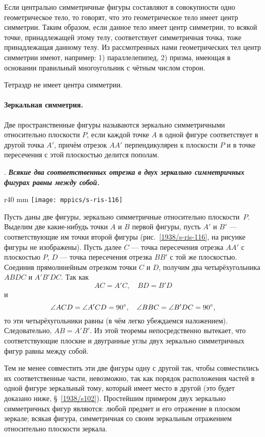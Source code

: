 Если центрально симметричные фигуры составляют в совокупности одно геометрическое тело, то говорят, что это геометрическое тело имеет центр симметрии.
Таким образом, если данное тело имеет центр симметрии, то всякой точке, принадлежащей этому телу, соответствует симметричная точка, тоже принадлежащая данному телу.
Из рассмотренных нами геометрических тел центр симметрии имеют, например: 1) параллелепипед, 2) призма, имеющая в основании правильный многоугольник с чётным числом сторон.

Тетраэдр не имеет центра симметрии.

\paragraph{Зеркальная симметрия.}\label{1938/s100}
Две пространственные фигуры называются зеркально симметричными относительно плоскости $P$, если каждой точке $A$ в одной фигуре соответствует в другой точка $A'$, причём отрезок $AA'$ перпендикулярен к плоскости $P$ и в точке пересечения с этой плоскостью делится пополам.

\medskip

.
\textbf{\emph{Всякие два соответственных отрезка в двух зеркально симметричных фигурах равны между собой.}}

\begin{wrapfigure}{r}{40 mm}
\vskip-0mm
\centering
\texttt{[image: mppics/s-ris-116]}
\caption{}\label{1938/s-ris-116}
\vskip-0mm
\end{wrapfigure}

Пусть даны две фигуры, зеркально симметричные относительно плоскости~$P$.
Выделим две какие-нибудь точки $A$ и $B$ первой фигуры, пусть $A'$ и $B'$ — соответствующие им точки второй фигуры (рис.~\ref{1938/s-ris-116}, на рисунке фигуры не изображены).
Пусть далее $C$ — точка пересечения отрезка $AA'$ с плоскостью $P$, $D$ — точка пересечения отрезка $BB'$ с той же плоскостью.
Соединив прямолинейным отрезком точки $C$ и $D$, получим два четырёхугольника $ABDC$ и $A'B'DC$.
Так как \[AC = A'C,\quad BD = B'D\] 
и 
\[\angle ACD = \angle A'CD=90\degree,\quad  \angle BBC = \angle B'DC=90\degree,\] то эти четырёхугольники равны (в чём легко убеждаемся наложением).
Следовательно, $AB=A'B'$.
Из этой теоремы непосредственно вытекает, что соответствующие плоские и двугранные углы двух зеркально симметричных фигур равны между собой.

Тем не менее совместить эти две фигуры одну с другой так, чтобы совместились их соответственные части, невозможно, так как порядок расположения частей в одной фигуре зеркальный тому, который имеет место в другой (это будет доказано ниже, §~\ref{1938/s102}).
Простейшим примером двух зеркально симметричных фигур являются: любой предмет и его отражение в плоском зеркале;
всякая фигура, симметричная со своим зеркальным отражением относительно плоскости зеркала.

